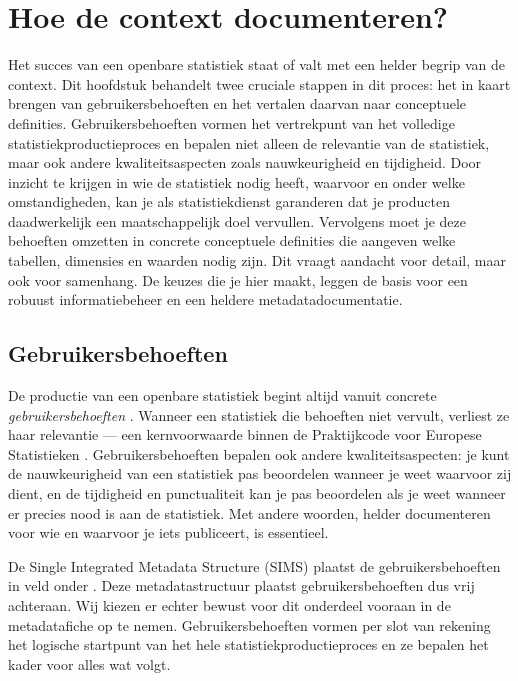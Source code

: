 \documentclass[\mainfiledir/00_handleiding_statistiekproductie.tex]{subfiles}
\begin{document}
	
	
	
	
	
	
\chapter{Hoe de context documenteren?}

Het succes van een openbare statistiek staat of valt met een helder begrip van de context. Dit hoofdstuk behandelt twee cruciale stappen in dit proces: het in kaart brengen van gebruikersbehoeften en het vertalen daarvan naar conceptuele definities. Gebruikersbehoeften vormen het vertrekpunt van het volledige statistiekproductieproces en bepalen niet alleen de relevantie van de statistiek, maar ook andere kwaliteitsaspecten zoals nauwkeurigheid en tijdigheid. Door inzicht te krijgen in wie de statistiek nodig heeft, waarvoor en onder welke omstandigheden, kan je als statistiekdienst garanderen dat je producten daadwerkelijk een maatschappelijk doel vervullen. Vervolgens moet je deze behoeften omzetten in concrete conceptuele definities die aangeven welke tabellen, dimensies en waarden nodig zijn. Dit vraagt aandacht voor detail, maar ook voor samenhang. De keuzes die je hier maakt, leggen de basis voor een robuust informatiebeheer en een heldere metadatadocumentatie.




\section{Gebruikersbehoeften}

De productie van een openbare statistiek begint altijd vanuit concrete \emph{gebruikersbehoeften} \parencite{UNSD2025Handbook}. Wanneer een statistiek die behoeften niet vervult, verliest ze haar relevantie --- een kernvoorwaarde binnen de Praktijkcode voor Europese Statistieken \parencite{Eurostat2017European}. Gebruikersbehoeften bepalen ook andere kwaliteitsaspecten: je kunt de nauwkeurigheid van een statistiek pas beoordelen wanneer je weet waarvoor zij dient, en de tijdigheid en punctualiteit kan je pas beoordelen als je weet wanneer er precies nood is aan de statistiek. Met andere woorden, helder documenteren voor wie en waarvoor je iets publiceert, is essentieel.

De Single Integrated Metadata Structure (SIMS) plaatst de gebruikersbehoeften in veld  onder . Deze metadatastructuur plaatst gebruikersbehoeften dus vrij achteraan. Wij kiezen er echter bewust voor dit onderdeel vooraan in de metadatafiche op te nemen. Gebruikersbehoeften vormen per slot van rekening het logische startpunt van het hele statistiekproductieproces \parencite[zoals ook beschreven in de][]{GSBPM2025} en ze bepalen het kader voor alles wat volgt.
\end{document}
